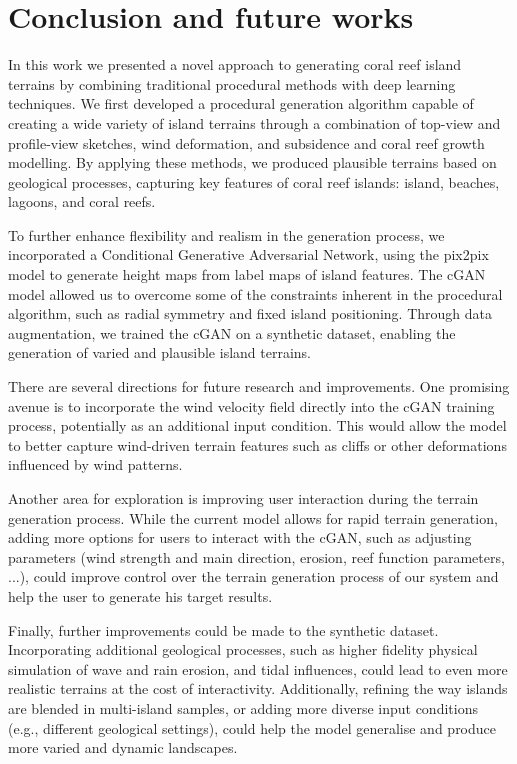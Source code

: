 \section{Conclusion and future works}
\label{sec:coral-island-conclusion}

In this work we presented a novel approach to generating coral reef island terrains by combining traditional procedural methods with deep learning techniques. We first developed a procedural generation algorithm capable of creating a wide variety of island terrains through a combination of top-view and profile-view sketches, wind deformation, and subsidence and coral reef growth modelling. By applying these methods, we produced plausible terrains based on geological processes, capturing key features of coral reef islands: island, beaches, lagoons, and coral reefs.

To further enhance flexibility and realism in the generation process, we incorporated a Conditional Generative Adversarial Network, using the pix2pix model to generate height maps from label maps of island features. The cGAN model allowed us to overcome some of the constraints inherent in the procedural algorithm, such as radial symmetry and fixed island positioning. Through data augmentation, we trained the cGAN on a synthetic dataset, enabling the generation of varied and plausible island terrains.


There are several directions for future research and improvements. One promising avenue is to incorporate the wind velocity field directly into the cGAN training process, potentially as an additional input condition. This would allow the model to better capture wind-driven terrain features such as cliffs or other deformations influenced by wind patterns.

Another area for exploration is improving user interaction during the terrain generation process. While the current model allows for rapid terrain generation, adding more options for users to interact with the cGAN, such as adjusting parameters (wind strength and main direction, erosion, reef function parameters, ...), could improve control over the terrain generation process of our system and help the user to generate his target results.

Finally, further improvements could be made to the synthetic dataset. Incorporating additional geological processes, such as higher fidelity physical simulation of wave and rain erosion, and tidal influences, could lead to even more realistic terrains at the cost of interactivity. Additionally, refining the way islands are blended in multi-island samples, or adding more diverse input conditions (e.g., different geological settings), could help the model generalise and produce more varied and dynamic landscapes.

